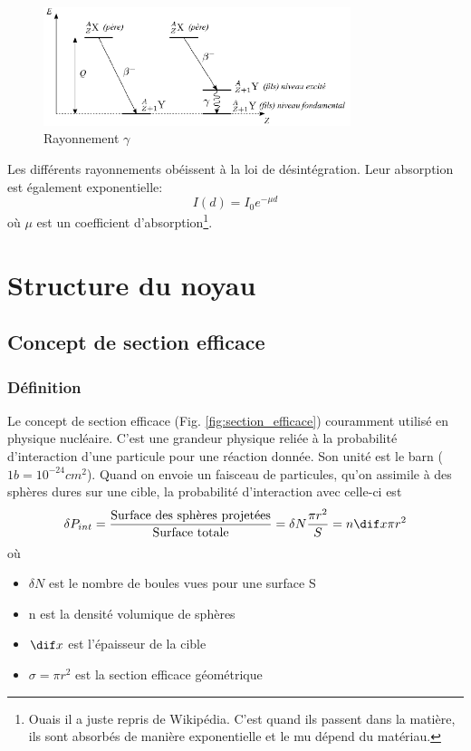 \begin{figure}[ht]
    \centering
    \includegraphics[width=0.8\textwidth]{Images1/gamma.PNG}
    \caption{Rayonnement $\gamma$}
    \label{fig:rayons_gamma}
\end{figure}
Les différents rayonnements obéissent à la loi de désintégration. Leur absorption est également exponentielle:
\[
    I(d)=I_0e^{-\mu d}
\]
où $\mu$ est un coefficient d'absorption\footnote{Ouais il a juste repris de Wikipédia. C'est quand ils passent dans la matière, ils sont absorbés de manière exponentielle et le mu dépend du matériau.}.


\section{Structure du noyau}
\subsection{Concept de section efficace}\label{sec:section_efficace}
\subsubsection{Définition}
Le concept de section efficace (Fig. \ref{fig:section_efficace}) couramment utilisé en physique nucléaire. C'est une grandeur physique reliée à la probabilité d'interaction d'une particule pour une réaction donnée. Son unité est le barn ($1b=10^{-24}cm^2$).
Quand on envoie un faisceau de particules, qu'on assimile à des sphères dures sur une cible, la probabilité d'interaction avec celle-ci est
\[
    \delta P_{int}=\dfrac{\text{Surface des sphères projetées}}{\text{Surface totale}}=\delta N \dfrac{\pi r^2}{S}=n \dif x \pi r^2
\]
où
\begin{itemize}
    \item $\delta N$ est le nombre de boules vues pour une surface S
    \item n est la densité volumique de sphères
    \item $\dif x$ est l'épaisseur de la cible
    \item $\sigma=\pi r^2$ est la section efficace géométrique
\end{itemize}

